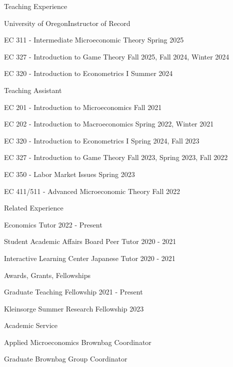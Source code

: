 \documentclass[
	11pt, %
]{resume} %
\begin{document}
\begin{rSection}{Teaching Experience}
  \begin{rSubsection}{University of Oregon}{}{Instructor of Record}{}
  \item EC 311 - Intermediate Microeconomic Theory \hfill Spring 2025
  \item EC 327 - Introduction to Game Theory \hfill Fall 2025, Fall 2024, Winter 2024
  \item EC 320 - Introduction to Econometrics I \hfill Summer 2024
  \end{rSubsection}
  \vspace{-.5cm}
  \begin{rSubsection}{}{}{Teaching Assistant}{}
  \item EC 201 - Introduction to Microeconomics \hfill Fall 2021
  \item EC 202 - Introduction to Macroeconomics \hfill Spring 2022, Winter 2021
  \item EC 320 - Introduction to Econometrics I \hfill Spring 2024, Fall 2023
  \item EC 327 - Introduction to Game Theory \hfill Fall 2023, Spring 2023, Fall 2022
  \item EC 350 - Labor Market Issues \hfill Spring 2023
  \item EC 411/511 - Advanced Microeconomic Theory \hfill Fall 2022
  \end{rSubsection}
  \begin{rSubsection}{Related Experience}{}{}{}
    \item Economics Tutor \hfill 2022 - Present
    \item Student Academic Affairs Board Peer Tutor \hfill 2020 - 2021
    \item Interactive Learning Center Japanese Tutor \hfill 2020 - 2021
  \end{rSubsection}
\end{rSection}

\begin{rSection}{Awards, Grants, Fellowships}
  \begin{rSubsection}{}{}{}{}
  \item Graduate Teaching Fellowship \hfill 2021 - Present
  \item Kleinsorge Summer Research Fellowship \hfill 2023
  \end{rSubsection}
\end{rSection}

\begin{rSection}{Academic Service}
  \begin{rSubsection}{}{}{}{}
  \item Applied Microeconomics Brownbag Coordinator
  \item Graduate Brownbag Group Coordinator
  \end{rSubsection}
\end{rSection}
\end{document}

